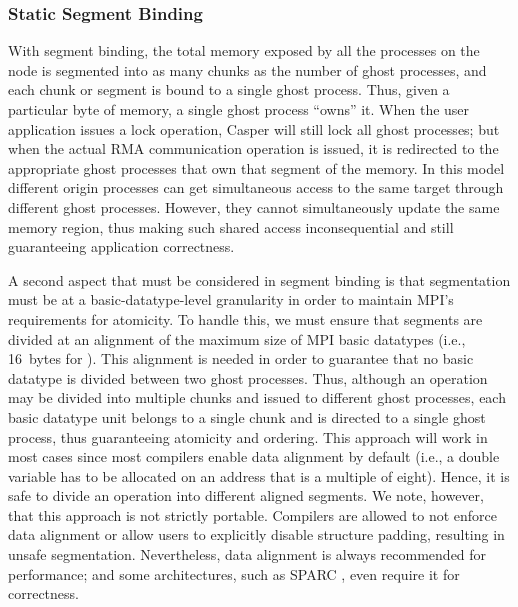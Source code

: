 \subsubsection{Static Segment Binding}  With segment binding, the total memory
exposed by all the processes on the node is segmented into as many
chunks as the number of ghost processes, and each chunk or segment is
bound to a single ghost process.  Thus, given a particular byte of
memory, a single ghost process ``owns'' it.  When the user application
issues a lock operation, Casper will still lock all ghost processes;
but when the actual RMA communication operation is issued, it is
redirected to the appropriate ghost processes that own that segment of
the memory.  In this model different origin
processes can get simultaneous access to the same target through
different ghost processes.  However, they cannot simultaneously update
the same memory region, thus making such shared access inconsequential
and still guaranteeing application correctness.

A second aspect that must be considered in segment binding is that
segmentation must be at a basic-datatype-level granularity in order to maintain
MPI's requirements for atomicity.  To handle this, we must ensure that
segments are divided at an alignment of the maximum size of MPI basic
datatypes (i.e., 16~bytes for ).  This alignment is needed in
order to guarantee that no basic datatype is divided between two ghost
processes.  Thus, although an operation may be divided into multiple
chunks and issued to different ghost processes, each basic datatype
unit belongs to a single chunk and is directed to a single ghost
process, thus guaranteeing atomicity and ordering.  This approach
will work in most cases since most compilers enable data alignment by
default (i.e., a double variable has to be allocated on an address
that is a multiple of eight).  Hence, it is safe to divide an
operation into different aligned segments.  We note, however, that this
approach is not strictly portable.  Compilers are allowed to not
enforce data alignment or allow users to explicitly disable structure
padding, resulting in unsafe segmentation.  Nevertheless, data
alignment is always recommended for performance; and some
architectures, such as SPARC \cite{sparc}, even require it for
correctness.


